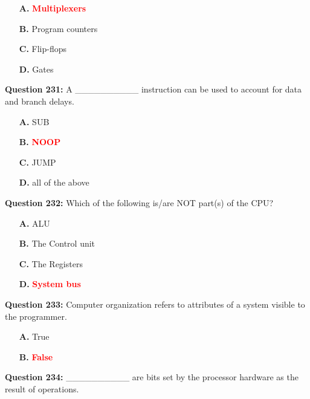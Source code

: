 \documentclass[12pt,a4paper]{article}
\begin{document}
\begin{itemize}
    \item[\textbf{A.}] \textcolor{red}{\textbf{Multiplexers}}
    \item[\textbf{B.}] Program counters
    \item[\textbf{C.}] Flip-flops
    \item[\textbf{D.}] Gates
\end{itemize}

\vspace{0.5cm}

\textbf{Question 231:} A __________ instruction can be used to account for data and branch delays.

\begin{itemize}
    \item[\textbf{A.}] SUB
    \item[\textbf{B.}] \textcolor{red}{\textbf{NOOP}}
    \item[\textbf{C.}] JUMP
    \item[\textbf{D.}] all of the above
\end{itemize}

\vspace{0.5cm}

\textbf{Question 232:} Which of the following is/are NOT part(s) of the CPU?

\begin{itemize}
    \item[\textbf{A.}] ALU
    \item[\textbf{B.}] The Control unit
    \item[\textbf{C.}] The Registers
    \item[\textbf{D.}] \textcolor{red}{\textbf{System bus}}
\end{itemize}

\vspace{0.5cm}

\textbf{Question 233:} Computer organization refers to attributes of a system visible to the programmer.

\begin{itemize}
    \item[\textbf{A.}] True
    \item[\textbf{B.}] \textcolor{red}{\textbf{False}}
\end{itemize}

\vspace{0.5cm}

\textbf{Question 234:} __________ are bits set by the processor hardware as the result of operations.
\end{document}
